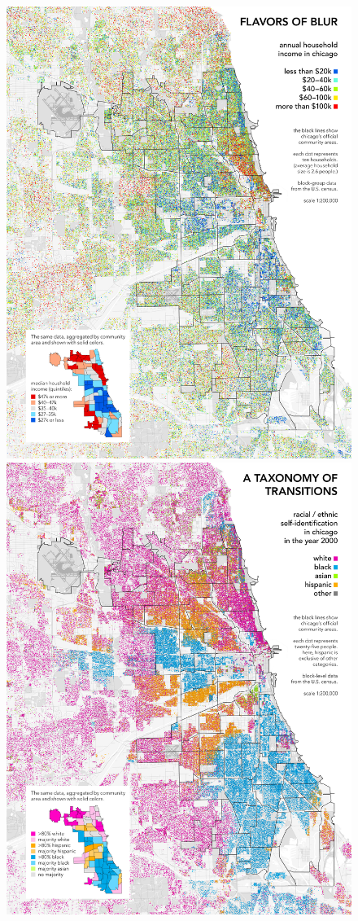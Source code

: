 \documentclass[11pt]{asaproc}
\newcommand{\1}{\mathbb{1}}
\begin{document}
\begin{figure}[!h]
\centering
\includegraphics[scale=.32]{figures/chicagodots_income_big.jpg}
\includegraphics[scale=.32]{figures/chicagodots_race_big.jpg}

\end{figure}
\end{document}
